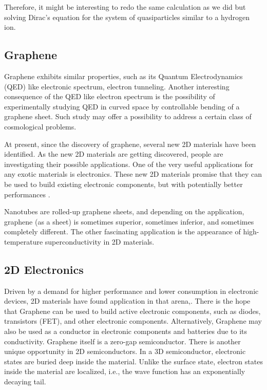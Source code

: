 Therefore, it might be interesting to redo the same calculation as we did but solving Dirac's equation for the system of quasiparticles similar to a hydrogen ion. 

\subsection{Graphene}
Graphene exhibits similar properties\cite{Graphene0}, such as its Quantum Electrodynamics (QED) like electronic spectrum, electron tunneling. Another interesting consequence of the QED like electron spectrum is the possibility of experimentally studying QED in curved space by controllable bending of a graphene sheet. Such study may offer a possibility to address a certain class of cosmological problems. 

At present, since the discovery of graphene, several new 2D materials have been identified\cite{Many2DMaterials}. 
As the new 2D materials are getting discovered, people are investigating their possible applications. One of the very useful applications for any exotic materials is electronics. These new 2D materials promise that they can be used to build existing electronic components, but with potentially better performances \cite{2DEJour1}\cite{2DEJour2}.

Nanotubes are rolled-up graphene sheets, and depending on the application, graphene (as a sheet) is sometimes superior, sometimes inferior, and sometimes completely different. The other fascinating application is the appearance of high-temperature superconductivity in 2D materials\cite{2DSuper}.

\subsection*{2D Electronics}
Driven by a demand for higher performance and lower consumption in electronic devices, 2D materials have found application in that arena\cite{2DEJour1},\cite{2DEJour2}. 
There is the hope that Graphene can be used to build active electronic components, such as diodes, transistors (FET), and other electronic components. Alternatively, Graphene may also be used as a conductor in electronic components and batteries due to its conductivity. Graphene itself is a zero-gap semiconductor. There is another unique opportunity in 2D semiconductors. In a 3D semiconductor, electronic states are buried deep inside the material. Unlike the surface state, electron states inside the material are localized, i.e., the wave function has an exponentially decaying tail.

